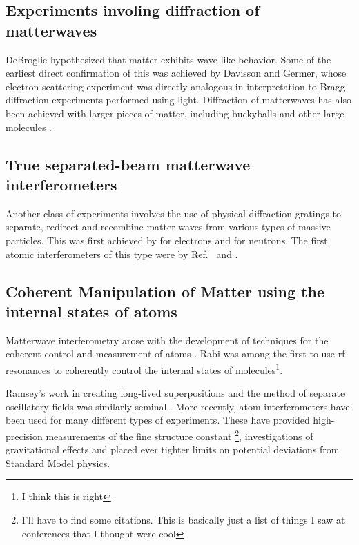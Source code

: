 \subsection{Experiments involing diffraction of matterwaves}
DeBroglie hypothesized that matter exhibits wave-like behavior. Some of the earliest direct confirmation of this was achieved by Davisson and Germer\cite{davisson_and_germer}, whose electron scattering experiment was directly analogous in interpretation to Bragg diffraction experiments performed using light. Diffraction of matterwaves has also been achieved with larger pieces of matter, including buckyballs\cite{C60_interferometry} and other large molecules \cite{large_molecule_interferometry}.

\subsection{True separated-beam matterwave interferometers}
Another class of experiments involves the use of physical diffraction gratings to separate, redirect and recombine matter waves from various types of massive particles. This was first achieved by \cite{electronGrating} for electrons and \cite{neutronGrating} for neutrons. The first atomic interferometers of this type were by Ref.~\cite{pritchard1991} and \cite{youngDoubleSlit_Carnal_Mlynek}.


\subsection{Coherent Manipulation of Matter using the internal states of atoms}
Matterwave interferometry arose with the development of techniques for the coherent control and measurement of atoms \cite{Kronin_RMP}. Rabi was among the first to use rf resonances to coherently control the internal states of molecules\footnote{I think this is right}. 

Ramsey's work in creating long-lived superpositions and the method of separate oscillatory fields was similarly seminal \cite{Kronin_RMP}\cite{Ramsey_original}. 
More recently, atom interferometers have been used for many different types of experiments. These have provided high-precision measurements of the fine structure constant \footnote{I'll have to find some citations. This is basically just a list of things I saw at conferences that I thought were cool}, investigations of gravitational effects and placed ever tighter limits on potential deviations from Standard Model physics. 

